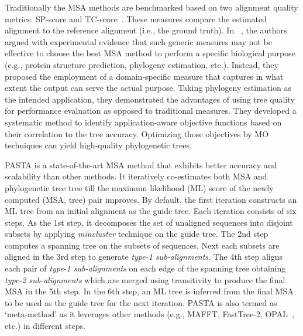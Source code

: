 Traditionally the MSA methods are benchmarked based on two alignment quality metrics: SP-score and TC-score~\cite{warnow2017computational}. These measures compare the estimated alignment to the reference alignment (i.e., the ground truth). In ~\cite{nayeem2020multiobjective, nayeem2019phylogeny}, the authors argued with experimental evidence that such generic measures may not be effective to choose the best MSA method to perform a specific biological purpose (e.g., protein structure prediction, phylogeny estimation, etc.). Instead, they proposed the employment of a domain-specific measure that captures in what extent the output can serve the actual purpose. Taking phylogeny estimation as the intended application, they demonstrated the advantages of using tree quality for performance evaluation as opposed to traditional measures. They developed a systematic method to identify application-aware objective functions based on their correlation to the tree accuracy. Optimizing those objectives by MO techniques can yield high-quality phylogenetic trees.


PASTA is a state-of-the-art MSA method that exhibits better accuracy and scalability than other methods. It iteratively co-estimates both MSA and phylogenetic tree  tree till the maximum likelihood (ML) score of the newly computed (MSA, tree) pair improves. By default, the first iteration constructs an ML tree from an initial alignment as the guide tree. Each iteration consists of six steps. As the 1st step, it decomposes the set of unaligned sequences into disjoint subsets by applying \textit{mincluster} technique  on the guide tree. The 2nd step computes a spanning tree on the subsets of sequences. Next each subsets are aligned in the 3rd step to generate \textit{type-1 sub-alignments}. The 4th step aligns each pair of \textit{type-1 sub-alignments} on each edge of the spanning tree obtaining \textit{type-2 sub-alignments} which are merged using transitivity to produce the final MSA in the 5th step. In the 6th step, an ML tree is inferred from the final MSA to be used as the guide tree for the next iteration. PASTA is also termed as `meta-method' as it leverages other methods (e.g., MAFFT, FastTree-2, OPAL~\cite{}, etc.) in different steps. 

